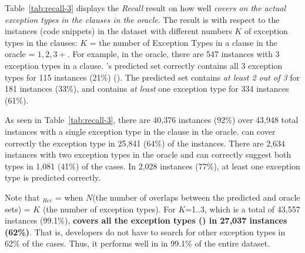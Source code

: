 Table~\ref{tab:recall-3} displays the {\em Recall} result on how well
{\em {\tool} covers on the actual exception types in the 
  clauses in the oracle}. The result is with respect to the instances
(code snippets) in the dataset with different numbers $K$ of exception
types in the  clauses: $K$ = the number of Exception Types
in a  clause in the oracle = $1,2,3+$. For example, in the
oracle, there are 547 instances with 3 exception types in a
 clause. {\tool}'s predicted set correctly contains all 3
exception types for 115 instances (21\%) (). The
predicted set contains {\em at least 2 out of 3} for 181 instances
(33\%), and contains {\em at least} one exception type for 334 instances
(61\%).



As seen in Table~\ref{tab:recall-3}, there are 40,376 instances (92\%)
over 43,948 total instances with a single exception type in the
 clause in the oracle. {\tool} can cover correctly the
exception type in 25,841 (64\%) of the instances. There are 2,634
instances with two exception types in the oracle and {\tool} can
correctly suggest both types in 1,081 (41\%) of the cases. In 2,028
instances (77\%), at least one exception type is predicted correctly.

Note that $_{Rec}$ =  when $N$(the number of
overlaps between the predicted and oracle sets) = $K$ (the number of
exception types). For $K$=1..3, which is a total of 43,557 instances
(99.1\%), {\bf {\tool} covers all the exception types ()
  in 27,037 instances (62\%)}. That is, developers do not have to search
for other exception types in 62\% of the cases. Thus, it performs well
in  in 99.1\% of the entire dataset. 

